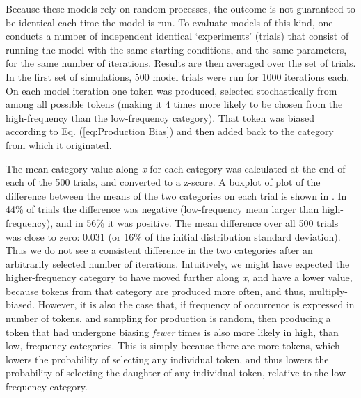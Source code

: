 Because these models rely on random processes, the outcome is not
guaranteed to be identical each time the model is run. To evaluate
models of this kind, one conducts a number of independent identical
`experiments' (trials) that consist of running the model with the
same starting conditions, and the same parameters, for the same number
of iterations. Results are then averaged over the set of trials. In
the first set of simulations, 500 model trials were run for 1000 iterations
each. On each model iteration one token was produced, selected stochastically
from among all possible tokens (making it 4 times more likely to be
chosen from the high-frequency than the low-frequency category). That
token was biased according to Eq. (\ref{eq:Production Bias}) and
then added back to the category from which it originated. 

The mean category value along \emph{x} for each category was calculated
at the end of each of the 500 trials, and converted to a z-score.
A boxplot of plot of the difference between the means of the two categories
on each trial is shown in . In 44\% of trials the
difference was negative (low-frequency mean larger than high-frequency),
and in 56\% it was positive. The mean difference over all 500 trials
was close to zero: 0.031 (or 16\% of the initial distribution standard
deviation). Thus we do not see a consistent difference in the two
categories after an arbitrarily selected number of iterations. Intuitively,
we might have expected the higher-frequency category to have moved
further along \emph{x}, and have a lower value, because tokens from
that category are produced more often, and thus, multiply-biased.
However, it is also the case that, if frequency of occurrence is expressed
in number of tokens, and sampling for production is random, then producing
a token that had undergone biasing \emph{fewer} times is also more
likely in high, than low, frequency categories. This is simply because
there are more tokens, which lowers the probability of selecting any
individual token, and thus lowers the probability of selecting the
daughter of any individual token, relative to the low-frequency category. 

